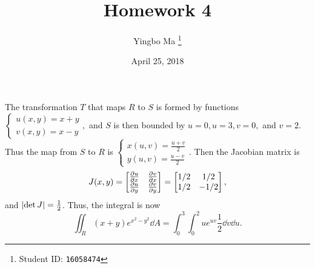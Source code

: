 \documentclass[8pt,twocolumn]{article}
\author{Yingbo Ma \thanks{Student ID: \tt{16058474}}}
\title{\vspace{-1.cm}Homework 4}
\date{April 25, 2018}
\begin{document}
\maketitle

\begin{Answer}[number=21]
  The transformation $T$ that maps $R$ to $S$ is formed by functions
  \(
    \begin{cases}
      u(x,y) = x+y \\
      v(x,y) = x-y
    \end{cases},
  \)
  and $S$ is then bounded by $u=0, u=3, v=0,$ and $v=2$. Thus the map from $S$
  to $R$ is
  \(
    \begin{cases}
      x(u,v) = \frac{u+v}{2} \\
      y(u,v) = \frac{u-v}{2}
    \end{cases}.
  \)
  Then the Jacobian matrix is
  \[
    J(x,y)={\begin{bmatrix}
      \pdv{u}{x}&\pdv{v}{x}\\
      \pdv{u}{y}&\pdv{v}{y}
    \end{bmatrix}}=
    \begin{bmatrix}1/2&1/2\\1/2&-1/2\end{bmatrix},
  \]
  and $\abs{\det J} = \frac{1}{2}$. Thus, the integral is now
      \[
    \iint_R (x+y)e^{x^2-y^2}\dd{A} = \int_0^3\int_0^2
    ue^{uv}\frac{1}{2}\dd{v}\dd{u}.
  \]
\end{Answer}
\end{document}
